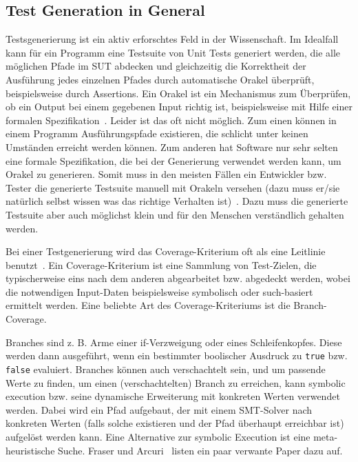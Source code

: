 \documentclass{article}
\begin{document}
\subsection{Test Generation in General}
Testsgenerierung ist ein aktiv erforschtes Feld in der Wissenschaft. Im Idealfall kann für ein Programm eine Testsuite von Unit Tests generiert werden, die alle möglichen Pfade im \ac{SUT} abdecken und gleichzeitig die Korrektheit der Ausführung jedes einzelnen Pfades durch automatische Orakel überprüft, beispielsweise durch Assertions. Ein Orakel ist ein Mechanismus zum Überprüfen, ob ein Output bei einem gegebenen Input richtig ist, beispielsweise mit Hilfe einer formalen Spezifikation~\cite{10.1145/1569901.1570127}. Leider ist das oft nicht möglich. Zum einen können in einem Programm Ausführungspfade existieren, die schlicht unter keinen Umständen erreicht werden können. Zum anderen hat Software nur sehr selten eine formale Spezifikation, die bei der Generierung verwendet werden kann, um Orakel zu generieren. Somit muss in den meisten Fällen ein Entwickler bzw. Tester die generierte Testsuite manuell mit Orakeln versehen (dazu muss er/sie natürlich selbst wissen was das richtige Verhalten ist)~\cite{Fraser_2013}. Dazu muss die generierte Testsuite aber auch möglichst klein und für den Menschen verständlich gehalten werden. 

Bei einer Testgenerierung wird das Coverage-Kriterium oft als eine Leitlinie benutzt~\cite{Fraser_2011}. Ein Coverage-Kriterium ist eine Sammlung von Test-Zielen, die typischerweise eins nach dem anderen abgearbeitet bzw. abgedeckt werden, wobei die notwendigen Input-Daten beispielsweise symbolisch oder such-basiert ermittelt werden. Eine beliebte Art des Coverage-Kriteriums ist die Branch-Coverage. 

Branches sind z. B. Arme einer if-Verzweigung oder eines Schleifenkopfes. Diese werden dann ausgeführt, wenn ein bestimmter boolischer Ausdruck zu \lstinline{true} bzw. \lstinline{false} evaluiert. Branches können auch verschachtelt sein, und um passende Werte zu finden, um einen (verschachtelten) Branch zu erreichen, kann symbolic execution bzw. seine dynamische Erweiterung mit konkreten Werten verwendet werden. Dabei wird ein Pfad aufgebaut, der mit einem \ac{SMT}-Solver nach konkreten Werten (falls solche existieren und der Pfad überhaupt erreichbar ist) aufgelöst werden kann. Eine Alternative zur symbolic Execution ist eine meta-heuristische Suche. Fraser und Arcuri~\cite{Fraser_2011} listen ein paar verwante Paper dazu auf. 
\end{document}
